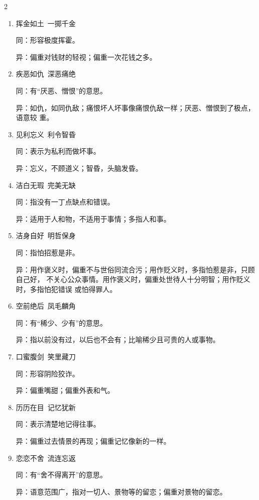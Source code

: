 \documentclass[final,oneside]{ctexbook}
\begin{document}
\begin{multicols}{2}
\begin{enumerate}
    \item 挥金如土~一掷千金

      同：形容极度挥霍。

      异：偏重对钱财的轻视；偏重一次花钱之多。

    \item 疾恶如仇~深恶痛绝

      同：有“厌恶、憎恨”的意思。

      异：如仇，如同仇敌；痛恨坏人坏事像痛恨仇敌一样；厌恶、憎恨到了极点，语意较
      重。

    \item 见利忘义~利令智昏

      同：表示为私利而做坏事。

      异：忘义，不顾道义；智昏，头脑发昏。

    \item 洁白无瑕~完美无缺

      同：指没有一丁点缺点和错误。

      异：适用于人和物，不适用于事情；多指人和事。

    \item 洁身自好~明哲保身

      同：指怕招惹是非。

      异：用作褒义时，偏重不与世俗同流合污；用作贬义时，多指怕惹是非，只顾自己好，
      不关心公众事情。用作褒义时，偏重处世待人十分明智；用作贬义时，多指怕犯错误
      或怕得罪人。

    \item 空前绝后~凤毛麟角

      同：有“稀少、少有”的意思。

      异：指以前没有过，以后也不会有；比喻稀少且可贵的人或事物。

    \item 口蜜腹剑~笑里藏刀

      同：形容阴险狡诈。

      异：偏重嘴甜；偏重外表和气。

    \item 历历在目~记忆犹新

      同：表示清楚地记得往事。

      异：偏重过去情景的再现；偏重记忆像新的一样。

    \item 恋恋不舍~流连忘返

      同：有“舍不得离开”的意思。

      异：语意范围广，指对一切人、景物等的留恋；偏重对景物的留恋。


\end{enumerate}
\end{multicols}
\end{document}
